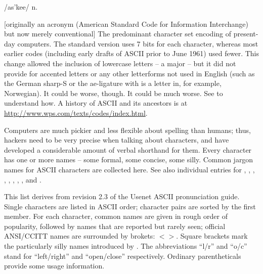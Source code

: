  /as'kee/ n.

[originally an acronym (American Standard Code for Information Interchange) but
now merely conventional] The predominant character set encoding of present-day
computers. The standard version uses 7 bits for each character, whereas most
earlier codes (including early drafts of ASCII prior to June 1961) used fewer.
This change allowed the inclusion of lowercase letters -- a major
 -- but it did not provide for accented letters or any other
letterforms not used in English (such as the German sharp-S or the ae-ligature
with is a letter in, for example, Norwegian). It could be worse, though. It
could be much worse. See  to understand how. A history of
ASCII and its ancestors is at \url{http://www.wps.com/texts/codes/index.html}.

Computers are much pickier and less flexible about spelling than humans; thus,
hackers need to be very precise when talking about characters, and have
developed a considerable amount of verbal shorthand for them. Every character
has one or more names -- some formal, some concise, some silly. Common jargon
names for ASCII characters are collected here. See also individual entries for
, , , ,
, , , ,
and .

This list derives from revision 2.3 of the Usenet ASCII pronunciation guide.
Single characters are listed in ASCII order; character pairs are sorted by the
first member. For each character, common names are given in rough order of
popularity, followed by names that are reported but rarely seen; official
ANSI/CCITT names are surrounded by brokets: $<$$>$. Square brackets mark the
particularly silly names introduced by . The abbreviations
``l/r'' and ``o/c'' stand for ``left/right'' and ``open/close'' respectively.
Ordinary parentheticals provide some usage information.

